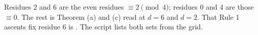 Residues $2$ and $6$ are the even residues $\equiv 2 \pmod 4$; residues $0$ and $4$ are those $\equiv 0$. The rest is Theorem (a) and (c) read at $d = 6$ and $d = 2$. That Rule 1 ascents fix residue $6$ is . The script lists both sets from the grid.

